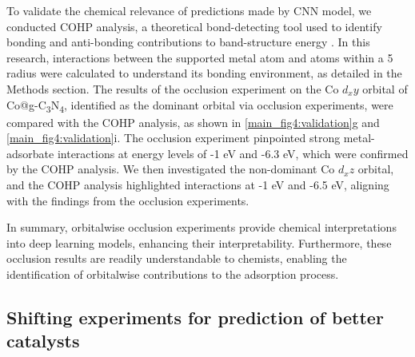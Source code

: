 \documentclass[a4paper, 12pt, titlepage]{article}
\begin{document}
    To validate the chemical relevance of predictions made by CNN model, we conducted COHP analysis, a theoretical bond-detecting tool used to identify bonding and anti-bonding contributions to band-structure energy \cite{deringer2011crystal}.
    In this research, interactions between the supported metal atom and atoms within a 5 \text{\AA} radius were calculated to understand its bonding environment, as detailed in the Methods section.
    The results of the occlusion experiment on the Co $d_xy$ orbital of Co@g-C\textsubscript{3}N\textsubscript{4}, identified as the dominant orbital via occlusion experiments, were compared with the COHP analysis, as shown in \cref{main_fig4:validation}g and \cref{main_fig4:validation}i.
    The occlusion experiment pinpointed strong metal-adsorbate interactions at energy levels of -1 eV and -6.3 eV, which were confirmed by the COHP analysis.
    We then investigated the non-dominant Co $d_xz$ orbital, and the COHP analysis highlighted interactions at -1 eV and -6.5 eV, aligning with the findings from the occlusion experiments.

    In summary, orbitalwise occlusion experiments provide chemical interpretations into deep learning models, enhancing their interpretability.
    Furthermore, these occlusion results are readily understandable to chemists, enabling the identification of orbitalwise contributions to the adsorption process.


    \subsection{Shifting experiments for prediction of better catalysts}
\end{document}
